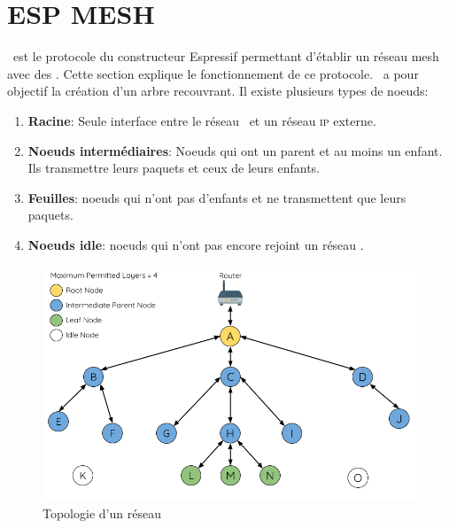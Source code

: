 \chapter{ESP MESH}
        \espmesh\ est le protocole du constructeur Espressif permettant d'établir un réseau mesh avec des \esp.
        Cette section explique le fonctionnement de ce protocole. \espmesh\ a pour objectif la création d'un arbre recouvrant.
        Il existe plusieurs types de noeuds:
        \begin{enumerate}
            \item \textbf{Racine}: Seule interface entre le réseau \espmesh\ et un réseau \textsc{ip} externe.
            \item \textbf{Noeuds intermédiaires}: Noeuds qui ont un parent et au moins un enfant.
            Ils transmettre leurs paquets et ceux de leurs enfants.
            \item \textbf{Feuilles}: noeuds qui n'ont pas d'enfants et ne transmettent que leurs paquets.
            \item \textbf{Noeuds idle}: noeuds qui n'ont pas encore rejoint un réseau \espmesh.
        \end{enumerate}

        \begin{figure}[H]
            \centering
            \includegraphics[scale=0.3]{images/mesh-node-types.png}
            \caption{Topologie d'un réseau \espmesh \cite{esp-mesh_w}}
        \end{figure}

